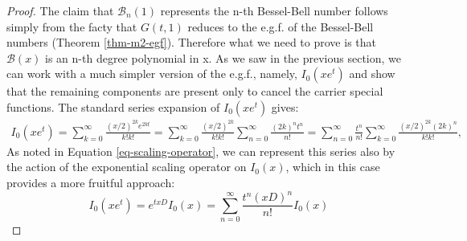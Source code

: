 \documentclass[a4paper]{amsart}
\begin{document}
\begin{proof}
The claim that $\mathscr{B}_n(1)$ represents the n-th Bessel-Bell number follows simply from the facty that $G(t,1)$ reduces to the e.g.f. of the Bessel-Bell numbers (Theorem \ref{thm-m2-egf}). Therefore what we need to prove is that $\mathscr{B}(x)$ is an n-th degree polynomial in x. As we saw in the previous section, we can work with a much simpler version of the e.g.f., namely, $I_0(xe^t)$ and show that the remaining components are present only to cancel the carrier special functions. The standard series expansion of $I_0(xe^t)$ gives:
\[
\begin{aligned}
I_0(x e^t) = \sum_{k=0}^\infty \frac{(x/2)^{2k} e^{2kt}}{k!k!} = \sum_{k=0}^\infty \frac{(x/2)^{2k}}{k!k!} \sum_{n=0}^\infty \frac{(2k)^n t^n}{n!} = \sum_{n=0}^\infty \frac{t^n}{n!} \sum_{k=0}^\infty \frac{(x/2)^{2k}(2k)^n}{k!k!},
\end{aligned}
\]
As noted in Equation \eqref{eq-scaling-operator}, we can represent this series also by the action of the exponential scaling operator on $I_0(x)$, which in this case provides a more fruitful approach:
\begin{equation}
   I_0(x e^t)= e^{txD}I_0(x)= \sum_{n=0}^{\infty}\frac{t^n(xD)^n}{n!}I_0(x)
\end{equation}


\end{proof}
\end{document}
